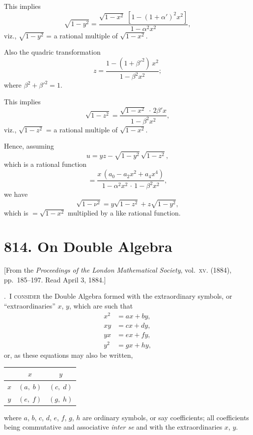\documentclass[11pt,a4paper]{book}
\begin{document}
This implies
\[
\sqrt{1-y^2} = \frac{\sqrt{1-x^2}\;[1 - (1+\alpha')^2 x^2]}{1 - \alpha^2 x^2},
\]
viz., $\sqrt{1-y^2}$ = a rational multiple of $\sqrt{1-x^2}$.

Also the quadric transformation
\[
z = \frac{1 - (1+\beta'^2)\,x^2}{1 - \beta^2 x^2};
\]
where $\beta^2 + \beta'^2 = 1$.

This implies
\[
\sqrt{1-z^2} = \frac{\sqrt{1-x^2}\;\cdot\,2\beta' x}{1 - \beta^2 x^2},
\]
viz., $\sqrt{1-z^2}$ = a rational multiple of $\sqrt{1-x^2}$.

Hence, assuming
\[
u = yz - \sqrt{1-y^2}\,\sqrt{1-z^2},
\]
which is a rational function
\[
= \frac{x\,(a_0 - a_2 x^2 + a_4 x^4)}{1 - \alpha^2 x^2\,\cdot\,1 - \beta^2 x^2},
\]
we have
\[
\sqrt{1-\nu^2} = y\sqrt{1-z^2} + z\sqrt{1-y^2},
\]
which is $= \sqrt{1-x^2}$ multiplied by a like rational function.


\newpage
\section*{814. On Double Algebra}

\begin{center}
\small[From the \textit{Proceedings of the London Mathematical Society}, vol.~\textsc{xv}. (1884),\\
pp.~185--197. Read April 3, 1884.]
\end{center}

\bigskip

.~\textsc{I consider} the Double Algebra formed with the extraordinary symbols, or ``extraordinaries'' $x$, $y$, which are such that
\begin{align*}
x^2 &= ax + by,\\
xy &= cx + dy,\\
yx &= ex + fy,\\
y^2 &= gx + hy,
\end{align*}
or, as these equations may also be written,
\begin{center}
\begin{tabular}{c|cc}
& $x$ & $y$ \\
\hline
$x$ & $(a,\;b)$ & $(c,\;d)$ \\
$y$ & $(e,\;f)$ & $(g,\;h)$ \\
\end{tabular}
\end{center}
\smallskip
where $a$, $b$, $c$, $d$, $e$, $f$, $g$, $h$ are ordinary symbols, or say coefficients; all coefficients being commutative and associative \textit{inter se} and with the extraordinaries $x$, $y$.
\end{document}
